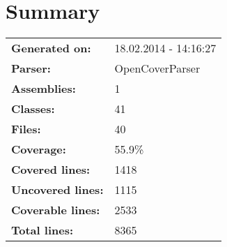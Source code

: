 \documentclass[a4paper,10pt]{article}
\begin{document}
\setcounter{secnumdepth}{-1}
\section{Summary}
\begin{longtable}[l]{ll}
\textbf{Generated on:} & 18.02.2014 - 14:16:27\\
\textbf{Parser:} & OpenCoverParser\\
\textbf{Assemblies:} & 1\\
\textbf{Classes:} & 41\\
\textbf{Files:} & 40\\
\textbf{Coverage:} & 55.9\%\\
\textbf{Covered lines:} & 1418\\
\textbf{Uncovered lines:} & 1115\\
\textbf{Coverable lines:} & 2533\\
\textbf{Total lines:} & 8365\\
\end{longtable}
\end{document}
